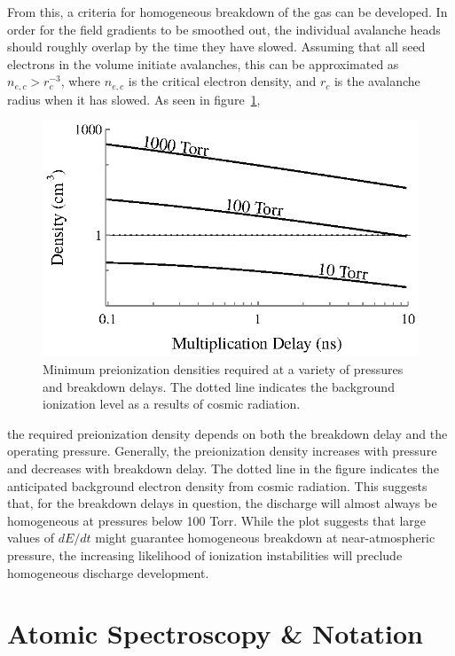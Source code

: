 From this, a criteria for homogeneous breakdown of the gas can be developed. In
order for the field gradients to be smoothed out, the individual avalanche heads
should roughly overlap by the time they have slowed. Assuming that all seed
electrons in the volume initiate avalanches, this can be approximated as
$n_{e,c} > r_c^{-3}$, where $n_{e,c}$ is the critical electron density, and
$r_c$ is the avalanche radius when it has slowed. As seen in
figure~\ref{fig:avalanche_densities},
\begin{figure}
  \centering
  \includegraphics{./chapters/theory/figures/avalanche_densities.eps}
  \caption{Minimum preionization densities required at a variety of pressures
    and breakdown delays. The dotted line indicates the background ionization
    level as a results of cosmic radiation.}
  \label{fig:avalanche_densities}
\end{figure}
the required preionization density depends on both the breakdown delay and the
operating pressure. Generally, the preionization density increases with pressure
and decreases with breakdown delay. The dotted line in the figure indicates the
anticipated background electron density from cosmic radiation. This suggests
that, for the breakdown delays in question, the discharge will almost always be
homogeneous at pressures below 100 Torr. While the plot suggests that large
values of $dE/dt$ might guarantee homogeneous breakdown at near-atmospheric
pressure, the increasing likelihood of ionization instabilities \cite{Johns1972}
will preclude homogeneous discharge development.

\section{Atomic Spectroscopy \& Notation}

